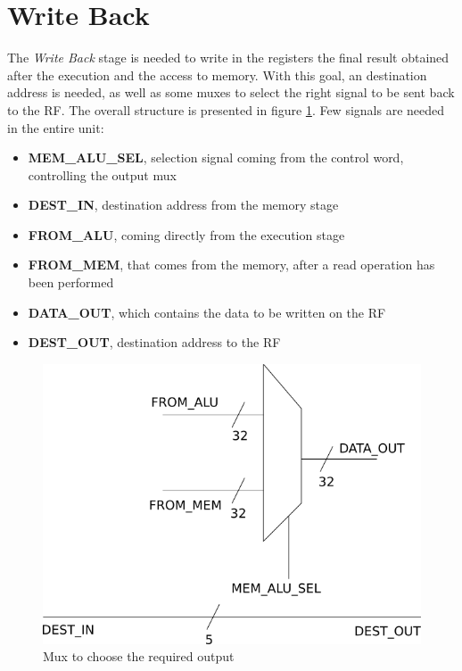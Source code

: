 \section{Write Back}
\label{chap_wb}


The \textit{Write Back} stage is needed to write in the registers the final result obtained after the execution and the access to memory. With this goal, an destination address is needed, as well as some muxes to select the right signal to be sent back to the \textsf{RF}. The overall structure is presented in figure \ref{wb_overall_fig}.
Few signals are needed in the entire unit:
\begin{itemize}
	\item \textbf{MEM\_ALU\_SEL}, selection signal coming from the control word, controlling the output mux
	\item \textbf{DEST\_IN}, destination address from the memory stage
	\item \textbf{FROM\_ALU}, coming directly from the execution stage
	\item \textbf{FROM\_MEM}, that comes from the memory, after a read operation has been performed
	\item \textbf{DATA\_OUT}, which contains the data to be written on the 
	\textsf{RF}
	\item \textbf{DEST\_OUT}, destination address to the \textsf{RF}
\end{itemize}

\begin{figure}
	\centering
	\includegraphics[scale=0.5]{chapters/figures/wb_stage}
	\caption{Mux to choose the required output}
	\label{wb_overall_fig}
\end{figure} 

